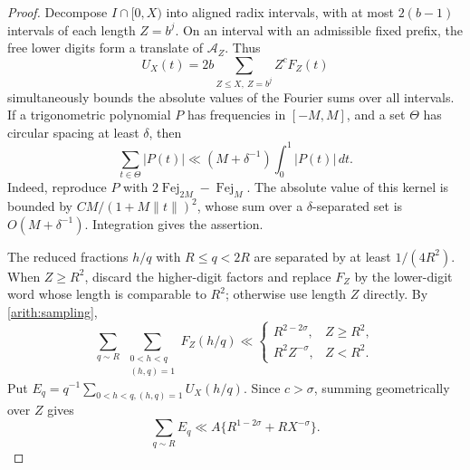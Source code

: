 \documentclass[11pt,a4paper]{article}
\theoremstyle{paperplain}
\numberwithin{equation}{section}
\begin{document}
\begin{proof}
Decompose $I\cap[0,X)$ into aligned radix intervals, with at most
$2(b-1)$ intervals of each length $Z=b^j$. On an interval with an
admissible fixed prefix, the free lower digits form a translate of
$\mathcal A_Z$. Thus
\[
 U_X(t)=2b\sum_{Z\le X,\ Z=b^j}Z^cF_Z(t)
\]
simultaneously bounds the absolute values of the Fourier sums over all
intervals.
If a trigonometric polynomial $P$ has frequencies in $[-M,M]$, and a
set $\Theta$ has circular spacing at least $\delta$, then
\begin{equation}\label{arith:sampling}
 \sum_{t\in\Theta}|P(t)|\ll(M+\delta^{-1})\int_0^1|P(t)|\,dt.
\end{equation}
Indeed, reproduce $P$ with $2\operatorname{Fej}_{2M}-\operatorname{Fej}_M$.
The absolute value of this kernel is bounded by
$CM/(1+M\|t\|)^2$, whose sum over a $\delta$-separated set is
$O(M+\delta^{-1})$. Integration gives the assertion.

The reduced fractions $h/q$ with $R\le q<2R$ are separated by at least
$1/(4R^2)$. When $Z\ge R^2$, discard the higher-digit factors and replace
$F_Z$ by the lower-digit word whose length is comparable to $R^2$;
otherwise use length $Z$ directly. By \eqref{arith:sampling},
\[
 \sum_{q\sim R}\ \sum_{\substack{0<h<q\\(h,q)=1}}F_Z(h/q)
 \ll
 \begin{cases}R^{2-2\sigma},&Z\ge R^2,\\
 R^2Z^{-\sigma},&Z<R^2.
 \end{cases}
\]
Put $E_q=q^{-1}\sum_{0<h<q,(h,q)=1}U_X(h/q)$.
Since $c>\sigma$, summing geometrically over $Z$ gives
\begin{equation}\label{arith:primitiveI}
 \sum_{q\sim R}E_q\ll A\{R^{1-2\sigma}+RX^{-\sigma}\}.
\end{equation}


\end{proof}
\end{document}
